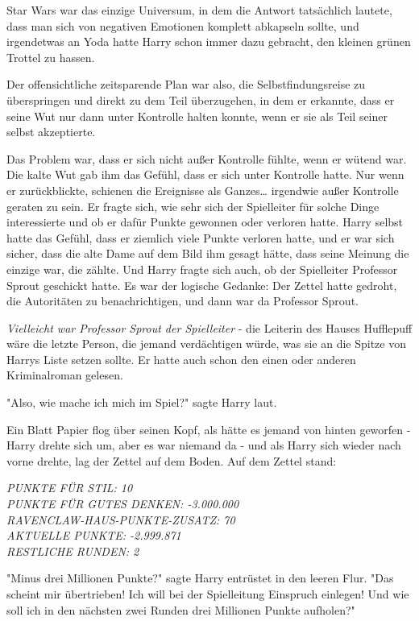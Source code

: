 {Star Wars war das einzige Universum, in dem die Antwort tatsächlich lautete, dass man sich von negativen Emotionen komplett abkapseln sollte, und irgendetwas an Yoda hatte Harry schon immer dazu gebracht, den kleinen grünen Trottel zu hassen.

Der offensichtliche zeitsparende Plan war also, die Selbstfindungsreise zu überspringen und direkt zu dem Teil überzugehen, in dem er erkannte, dass er seine Wut nur dann unter Kontrolle halten konnte, wenn er sie als Teil seiner selbst akzeptierte.

Das Problem war, dass er sich nicht außer Kontrolle fühlte, wenn er wütend war. Die kalte Wut gab ihm das Gefühl, dass er sich unter Kontrolle hatte. Nur wenn er zurückblickte, schienen die Ereignisse als Ganzes… irgendwie außer Kontrolle geraten zu sein. Er fragte sich, wie sehr sich der Spielleiter für solche Dinge interessierte und ob er dafür Punkte gewonnen oder verloren hatte. Harry selbst hatte das Gefühl, dass er ziemlich viele Punkte verloren hatte, und er war sich sicher, dass die alte Dame auf dem Bild ihm gesagt hätte, dass seine Meinung die einzige war, die zählte. Und Harry fragte sich auch, ob der Spielleiter Professor Sprout geschickt hatte. Es war der logische Gedanke: Der Zettel hatte gedroht, die Autoritäten zu benachrichtigen, und dann war da Professor Sprout.

\emph{Vielleicht war Professor Sprout der Spielleiter} - die Leiterin des Hauses Hufflepuff wäre die letzte Person, die jemand verdächtigen würde, was sie an die Spitze von Harrys Liste setzen sollte. Er hatte auch schon den einen oder anderen Kriminalroman gelesen.

"Also, wie mache ich mich im Spiel?" sagte Harry laut.

Ein Blatt Papier flog über seinen Kopf, als hätte es jemand von hinten geworfen - Harry drehte sich um, aber es war niemand da - und als Harry sich wieder nach vorne drehte, lag der Zettel auf dem Boden. Auf dem Zettel stand:

\emph{PUNKTE FÜR STIL: 10}\\ \emph{PUNKTE FÜR GUTES DENKEN: -3.000.000}\\ \emph{RAVENCLAW-HAUS-PUNKTE-ZUSATZ: 70}\\ \emph{AKTUELLE PUNKTE: -2.999.871}\\ \emph{RESTLICHE RUNDEN: 2}

"Minus drei Millionen Punkte?" sagte Harry entrüstet in den leeren Flur. "Das scheint mir übertrieben! Ich will bei der Spielleitung Einspruch einlegen! Und wie soll ich in den nächsten zwei Runden drei Millionen Punkte aufholen?"

}
